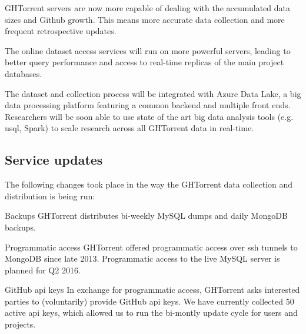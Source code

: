 \documentclass{sig-alternate}
\begin{document}
\begin{compactitem}

  \item GHTorrent servers are now more capable of dealing with the accumulated
    data sizes and Github growth. This means more accurate data collection
    and more frequent retrospective updates.

  \item The online dataset access services will run on more powerful servers,
    leading to better query performance and access to real-time replicas of
    the main project databases.

  \item The dataset and collection process will be integrated with Azure
    Data Lake, a big data processing platform featuring a common backend
    and multiple front ends. Researchers will be soon able to use state
    of the art big data analysis tools (e.g. {\sc usql}, Spark) to scale
    research across all GHTorrent data in real-time.

\end{compactitem}


\subsection{Service updates}

The following changes took place in the way the GHTorrent data collection
and distribution is being run:

\begin{compactdesc}

  \item[Backups] GHTorrent distributes bi-weekly MySQL dumps and daily MongoDB
    backups.

  \item[Programmatic access] GHTorrent offered programmatic access over
    {\sc ssh} tunnels to MongoDB since late 2013. Programmatic access to the
    live MySQL server is planned for Q2 2016.

  \item[GitHub {\sc api} keys] In exchange for programmatic access, GHTorrent asks
    interested parties to (voluntarily) provide GitHub {\sc api} keys. We have
    currently collected 50 active {\sc api} keys, which allowed us to run the
    bi-montly update cycle for users and projects.

\end{compactdesc}

\end{document}
